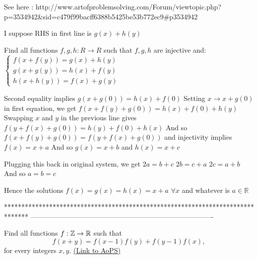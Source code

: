 \begin{solution}
	See here :
http://www.artofproblemsolving.com/Forum/viewtopic.php?p=3534942&sid=c479f99bacff6388b5425be53b772ec9#p3534942
\end{solution}



\begin{solution}
	I suppose RHS in first line is $g(x)+h(y)$
\begin{tcolorbox}Find all functions $f,g,h:R\to R$ such that $f,g,h$ are injective and:
$\begin{cases}f(x+f(y))=g(x)+h(y)\\g(x+g(y))=h(x)+f(y)\\h(x+h(y))=f(x)+g(y)\end{cases}$\end{tcolorbox}
Second equality implies $g(x+g(0))=h(x)+f(0)$
Setting $x\to x+g(0)$ in first equation, we get $f(x+f(y)+g(0))=h(x)+f(0)+h(y)$
Swapping $x$ and $y$ in the previous line gives $f(y+f(x)+g(0))=h(y)+f(0)+h(x)$
And so $f(x+f(y)+g(0))=f(y+f(x)+g(0))$ and injectivity implies $f(x)=x+a$
And so $g(x)=x+b$ and $h(x)=x+c$

Plugging this back in original system, we get 
$2a=b+c$
$2b=c+a$
$2c=a+b$
And so $a=b=c$

Hence the solutions $\boxed{f(x)=g(x)=h(x)=x+a}$ $\forall x$ and whatever is $a\in\mathbb R$
\end{solution}
*******************************************************************************
-------------------------------------------------------------------------------

\begin{problem}
	Find all functions $f : \Bbb{Z}\to \Bbb{R}$  such that \[f(x+y) = f(x-1)f(y) + f(y-1)f(x),\] for every integers $x, y.$
	\flushright \href{https://artofproblemsolving.com/community/c6h616011}{(Link to AoPS)}
\end{problem}



